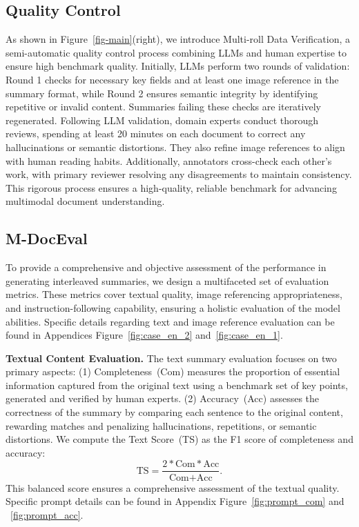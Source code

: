 \subsection{Quality Control}
\label{sec:3.4}
As shown in Figure~\ref{fig-main}(right), we introduce Multi-roll Data Verification, a semi-automatic quality control process combining LLMs and human expertise to ensure high benchmark quality. 
Initially, LLMs perform two rounds of validation: Round 1 checks for necessary key fields and at least one image reference in the summary format, while Round 2 ensures semantic integrity by identifying repetitive or invalid content. 
Summaries failing these checks are iteratively regenerated. 
Following LLM validation, domain experts conduct thorough reviews, spending at least 20 minutes on each document to correct any hallucinations or semantic distortions. 
They also refine image references to align with human reading habits. 
Additionally, annotators cross-check each other’s work, with primary reviewer resolving any disagreements to maintain consistency. 
This rigorous process ensures a high-quality, reliable benchmark for advancing multimodal document understanding.

\subsection{M-DocEval}
\label{sec:3.5}
To provide a comprehensive and objective assessment of the performance in generating interleaved summaries, we design a multifaceted set of evaluation metrics. 
These metrics cover textual quality, image referencing appropriateness, and instruction-following capability, ensuring a holistic evaluation of the model abilities.
Specific details regarding text and image reference evaluation can be found in Appendices Figure~\ref{fig:case_en_2} and~\ref{fig:case_en_1}.

\textbf{Textual Content Evaluation.} The text summary evaluation focuses on two primary aspects:
(1) Completeness~(Com) measures the proportion of essential information captured from the original text using a benchmark set of key points, generated and verified by human experts. 
(2) Accuracy~(Acc) assesses the correctness of the summary by comparing each sentence to the original content, rewarding matches and penalizing hallucinations, repetitions, or semantic distortions. 
We compute the Text Score~(TS) as the F1 score of completeness and accuracy:
\begin{equation}
\text{TS} = \frac{2 * \text{Com} * \text{Acc}}{\text{Com} + \text{Acc}}.
\end{equation}
This balanced score ensures a comprehensive assessment of the textual quality.
Specific prompt details can be found in Appendix Figure~\ref{fig:prompt_com} and ~\ref{fig:prompt_acc}.

